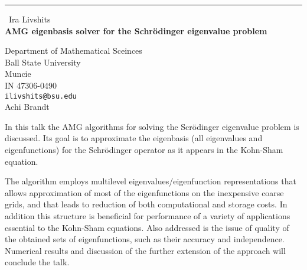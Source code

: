 \documentclass{report}
\begin{document}
\begin{center}
\rule{6in}{1pt} \
{\large Ira Livshits \\
{\bf AMG eigenbasis solver for the Schr\"{o}dinger eigenvalue problem }}

Department of Mathematical Sceinces \\ Ball State University \\ Muncie \\ IN 47306-0490
\\
{\tt ilivshits@bsu.edu}\\
Achi Brandt \end{center}

In this talk the AMG algorithms for solving the Scr\"{o}dinger eigenvalue
problem is discussed. Its goal is to approximate the eigenbasis (all
eigenvalues and eigenfunctions) for the Schr\"{o}dinger operator as it
appears in the Kohn-Sham equation.

The algorithm employs multilevel eigenvalues/eigenfunction
representations that allows approximation of most of the eigenfunctions
on the inexpensive coarse grids, and that leads to reduction of both
computational and storage costs. In addition this structure is beneficial
for performance of a variety of applications essential to the Kohn-Sham
equations. Also addressed is the issue of quality of the obtained
sets of eigenfunctions, such as their accuracy and independence.
Numerical results and discussion of the further extension of the approach
will conclude the talk.
\end{document}
